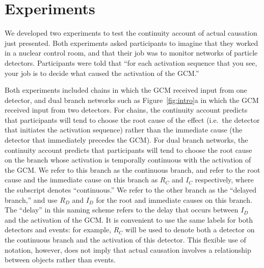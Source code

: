 \documentclass[10pt,letterpaper]{article}
\newcommand{\ev}[2]{$#1_#2$}
\begin{document}
\section{Experiments}

We developed two experiments to test the continuity account of actual causation just presented. Both experiments asked participants to imagine that they worked in a nuclear control room, and that their job was to monitor networks of particle detectors.  Participants were told that ``for each activation sequence that you see, your job is to decide what caused the activation of the GCM.'' 


Both experiments included chains in which the GCM received input from one detector, and dual branch networks such as Figure~\ref{fig:intro}a in which the GCM received input from two detectors. For chains, the continuity account predicts that participants will tend to choose the root cause of the effect (i.e.\ the detector that initiates the activation sequence) rather than the immediate cause (the detector that immediately precedes the GCM). For dual branch networks, the continuity account predicts that participants will tend to choose the root cause on the branch whose activation is temporally continuous with the activation of the GCM. We refer to this branch as the continuous branch, and refer to the root cause and the immediate cause on this branch as \ev{R}{C} and \ev{I}{C} respectively, where the subscript denotes ``continuous.'' We refer to the other branch as the ``delayed branch,'' and use \ev{R}{D} and \ev{I}{D} for the root and immediate causes on this branch. The ``delay'' in this naming scheme refers to the delay that occurs between \ev{I}{D} and the activation of the GCM. It is convenient to use the same labels for both detectors and events: for example, \ev{R}{C} will be used to denote both a detector on the continuous branch and the activation of this detector. This flexible use of notation, however, does not imply that actual causation involves a relationship between objects rather than events.
\end{document}
